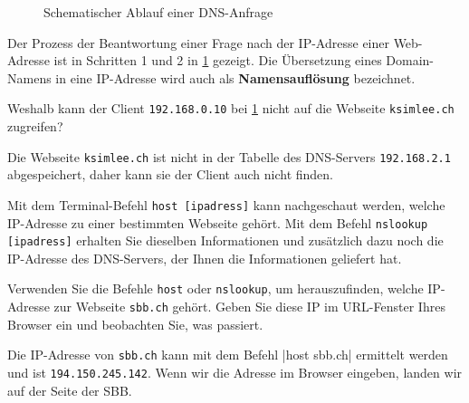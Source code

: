 \begin{figure}[H]
	\centering
	\caption{Schematischer Ablauf einer DNS-Anfrage}
	\label{fig:dns}
\end{figure}

Der Prozess der Beantwortung einer Frage nach der IP-Adresse einer Web-Adresse ist in Schritten 1 und 2 in \cref{fig:dns} gezeigt. Die Übersetzung eines Domain-Namens in eine \gls{IP}-Adresse wird auch als \textbf{Namensauflösung} bezeichnet.

\begin{myexercise}
	Weshalb kann der Client \texttt{192.168.0.10} bei \cref{fig:dns} nicht auf die Webseite \texttt{ksimlee.ch} zugreifen?
	\begin{myanswer}
		Die Webseite \texttt{ksimlee.ch} ist nicht in der Tabelle des \gls{DNS}-Servers \texttt{192.168.2.1} abgespeichert, daher kann sie der Client auch nicht finden.
	\end{myanswer}
\end{myexercise}


Mit dem Terminal-Befehl \texttt{host [ipadress]} kann nachgeschaut werden, welche \gls{IP}-Adresse zu einer bestimmten Webseite gehört. Mit dem Befehl \texttt{nslookup [ipadress]} erhalten Sie dieselben Informationen und zusätzlich dazu noch die \gls{IP}-Adresse des \gls{DNS}-Servers, der Ihnen die Informationen geliefert hat.



\begin{myexercise}
	Verwenden Sie die Befehle \texttt{host} oder \texttt{nslookup}, um herauszufinden, welche \gls{IP}-Adresse zur Webseite \texttt{sbb.ch} gehört. Geben Sie diese \gls{IP} im URL-Fenster Ihres Browser ein und beobachten Sie, was passiert.
	\begin{myanswer}
		Die IP-Adresse von \texttt{sbb.ch} kann mit dem Befehl \commandbox|host sbb.ch| ermittelt werden und ist \texttt{194.150.245.142}. Wenn wir die Adresse im Browser eingeben, landen wir auf der Seite der SBB.
	\end{myanswer}
\end{myexercise}

